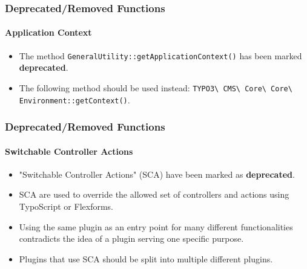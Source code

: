 
\begin{frame}[fragile]
	\frametitle{Deprecated/Removed Functions}
	\framesubtitle{Application Context}

	\lstset{basicstyle=\tiny\ttfamily}

	\begin{itemize}
		\item The method \texttt{GeneralUtility::getApplicationContext()} has been marked \textbf{deprecated}.
		\item The following method should be used instead:\newline
		 	\texttt{TYPO3\textbackslash
				CMS\textbackslash
				Core\textbackslash
				Core\textbackslash
				Environment::getContext()}.

	\end{itemize}

\end{frame}


\begin{frame}[fragile]
	\frametitle{Deprecated/Removed Functions}
	\framesubtitle{Switchable Controller Actions}

	\begin{itemize}
		\item "Switchable Controller Actions" (SCA) have been marked as \textbf{deprecated}.
		\item SCA are used to override the allowed set of controllers and actions using TypoScript or Flexforms.
		\item Using the same plugin as an entry point for many different functionalities contradicts the idea of a plugin serving one specific purpose.
		\item Plugins that use SCA should be split into multiple different plugins.
	\end{itemize}

\end{frame}

